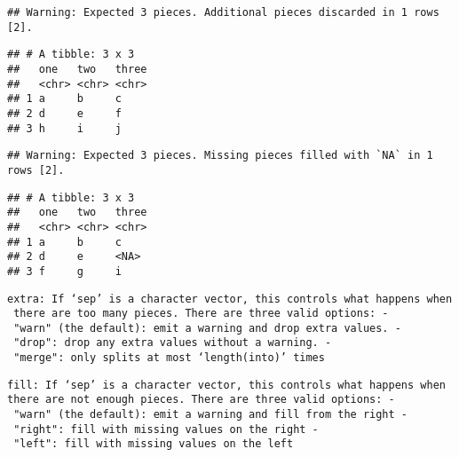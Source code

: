 \documentclass[]{ltjsarticle}
\newenvironment{Shaded}{\begin{snugshade}}{\end{snugshade}}
\newcommand{\DataTypeTok}[1]{\textcolor[rgb]{0.13,0.29,0.53}{#1}}
\newcommand{\KeywordTok}[1]{\textcolor[rgb]{0.13,0.29,0.53}{\textbf{#1}}}
\newcommand{\NormalTok}[1]{#1}
\newcommand{\OperatorTok}[1]{\textcolor[rgb]{0.81,0.36,0.00}{\textbf{#1}}}
\newcommand{\StringTok}[1]{\textcolor[rgb]{0.31,0.60,0.02}{#1}}
\begin{document}
\begin{verbatim}
## Warning: Expected 3 pieces. Additional pieces discarded in 1 rows [2].
\end{verbatim}

\begin{verbatim}
## # A tibble: 3 x 3
##   one   two   three
##   <chr> <chr> <chr>
## 1 a     b     c    
## 2 d     e     f    
## 3 h     i     j
\end{verbatim}

\begin{Shaded}
\end{Shaded}

\begin{verbatim}
## Warning: Expected 3 pieces. Missing pieces filled with `NA` in 1 rows [2].
\end{verbatim}

\begin{verbatim}
## # A tibble: 3 x 3
##   one   two   three
##   <chr> <chr> <chr>
## 1 a     b     c    
## 2 d     e     <NA> 
## 3 f     g     i
\end{verbatim}

\texttt{extra:\ If\ ‘sep’\ is\ a\ character\ vector,\ this\ controls\ what\ happens\ when\ there\ are\ too\ many\ pieces.\ There\ are\ three\ valid\ options:\ -\ "warn"\ (the\ default):\ emit\ a\ warning\ and\ drop\ extra\ values.\ -\ "drop":\ drop\ any\ extra\ values\ without\ a\ warning.\ -\ "merge":\ only\ splits\ at\ most\ ‘length(into)’\ times}

\texttt{fill:\ If\ ‘sep’\ is\ a\ character\ vector,\ this\ controls\ what\ happens\ when\ there\ are\ not\ enough\ pieces.\ There\ are\ three\ valid\ options:\ -\ "warn"\ (the\ default):\ emit\ a\ warning\ and\ fill\ from\ the\ right\ -\ "right":\ fill\ with\ missing\ values\ on\ the\ right\ -\ "left":\ fill\ with\ missing\ values\ on\ the\ left}

\begin{Shaded}
\end{Shaded}
\end{document}

